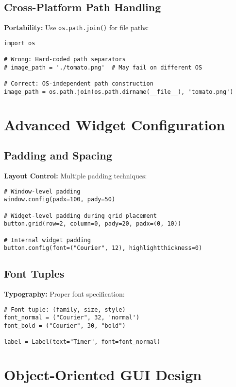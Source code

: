 \documentclass[12pt]{article}
\begin{document}
\subsection{Cross-Platform Path Handling}
\textbf{Portability:} Use \texttt{os.path.join()} for file paths:

\begin{lstlisting}
import os

# Wrong: Hard-coded path separators
# image_path = './tomato.png'  # May fail on different OS

# Correct: OS-independent path construction
image_path = os.path.join(os.path.dirname(__file__), 'tomato.png')
\end{lstlisting}

\section{Advanced Widget Configuration}

\subsection{Padding and Spacing}
\textbf{Layout Control:} Multiple padding techniques:

\begin{lstlisting}
# Window-level padding
window.config(padx=100, pady=50)

# Widget-level padding during grid placement
button.grid(row=2, column=0, pady=20, padx=(0, 10))

# Internal widget padding
button.config(font=("Courier", 12), highlightthickness=0)
\end{lstlisting}

\subsection{Font Tuples}
\textbf{Typography:} Proper font specification:

\begin{lstlisting}
# Font tuple: (family, size, style)
font_normal = ("Courier", 32, 'normal')
font_bold = ("Courier", 30, "bold")

label = Label(text="Timer", font=font_normal)
\end{lstlisting}

\section{Object-Oriented GUI Design}
\end{document}
